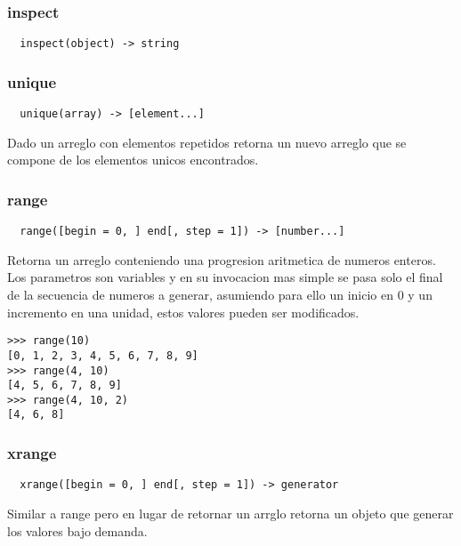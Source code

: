 \subsubsection*{inspect}
\begin{verbatim}
  inspect(object) -> string
\end{verbatim}

\subsubsection*{unique}
\begin{verbatim}
  unique(array) -> [element...]
\end{verbatim}
Dado un arreglo con elementos repetidos retorna un nuevo arreglo que se compone de los elementos unicos encontrados.

\subsubsection*{range}
\begin{verbatim}
  range([begin = 0, ] end[, step = 1]) -> [number...]
\end{verbatim}
Retorna un arreglo conteniendo una progresion aritmetica de numeros enteros.
Los parametros son variables y en su invocacion mas simple se pasa solo el final
de la secuencia de numeros a generar, asumiendo para ello un inicio en 0 y un
incremento en una unidad, estos valores pueden ser modificados.
\begin{lstlisting}[style=consola]
>>> range(10)
[0, 1, 2, 3, 4, 5, 6, 7, 8, 9]
>>> range(4, 10)
[4, 5, 6, 7, 8, 9]
>>> range(4, 10, 2)
[4, 6, 8]
\end{lstlisting}

\subsubsection*{xrange}
\begin{verbatim}
  xrange([begin = 0, ] end[, step = 1]) -> generator
\end{verbatim}
Similar a range pero en lugar de retornar un arrglo retorna un objeto que
generar los valores bajo demanda.

